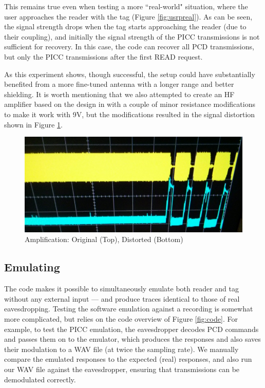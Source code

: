 \documentclass[fleqn,10pt]{SelfArx} %
\begin{document}
This remains true even when testing a more ``real-world" situation, where the user approaches the reader with the tag (Figure \ref{fig:usrpreal}). As can be seen, the signal strength drops when the tag starts approaching the reader (due to their coupling), and initially the signal strength of the PICC transmissions is not sufficient for recovery. In this case, the code can recover all PCD transmissions, but only the PICC transmissions after the first READ request.


As this experiment shows, though successful, the setup could have substantially benefited from a more fine-tuned antenna with a longer range and better shielding. It is worth mentioning that we also attempted to create an HF amplifier based on the design in \cite{amplifier} with a couple of minor resistance modifications to make it work with 9V, but the modifications resulted in the signal distortion shown in Figure \ref{fig:amplified}.

\begin{figure}[t]
  \includegraphics[width=\linewidth]{img/amplified}
  \caption{Amplification: Original (Top), Distorted (Bottom)}
  \label{fig:amplified}
\end{figure}

\subsection{Emulating}
\label{subsec:evalemulate}

The code makes it possible to simultaneously emulate both reader and tag without any external input --- and produce traces identical to those of real eavesdropping. Testing the software emulation against a recording is somewhat more complicated, but relies on the code overview of Figure \ref{fig:code}. For example, to test the PICC emulation, the eavesdropper decodes PCD commands and passes them on to the emulator, which produces the responses and also saves their modulation to a WAV file (at twice the sampling rate). We manually compare the emulated responses to the expected (real) responses, and also run our WAV file against the eavesdropper, ensuring that transmissions can be demodulated correctly. 
\end{document}
